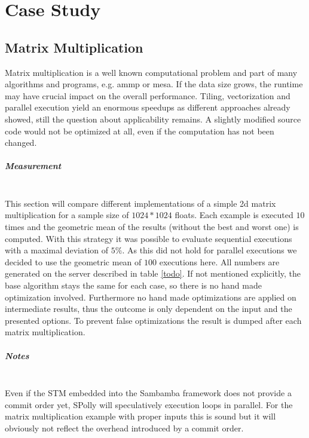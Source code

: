 
\chapter{Case Study} %
\label{Chapter6}


\section{Matrix Multiplication}
\label{MatrixMultiplication}
Matrix multiplication is a well known computational problem and part of many 
algorithms and programs, e.g. ammp or mesa.
If the data size grows, the runtime may have crucial impact on the
overall performance. Tiling, vectorization and parallel execution yield an
enormous speedups as different approaches already
showed\cite{grosser:thesis, JIMBOREAN-2012-664345},
still the question about applicability remains. A slightly modified source code 
would not be optimized at all, even if the computation has not been changed. 

\paragraph{Measurement} ~\\
This section will compare different implementations of a simple 2d
matrix multiplication for a sample size of  $1024*1024$ floats.
Each example is executed $10$ times and the geometric mean of the results 
(without the best and worst one) is computed. With this strategy it was possible 
to evaluate sequential executions with a maximal deviation of $5\%$. As this 
did not hold for parallel executions we decided to use the geometric mean of 
$100$ executions here. All numbers are generated on 
the server described in table \ref{todo}. If not mentioned explicitly, the base
algorithm stays the same for each case, so there is no hand made optimization 
involved. Furthermore no hand made optimizations are applied on intermediate 
results, thus the outcome is only dependent on the input and the presented 
options. To prevent false optimizations the result is dumped after each matrix
multiplication. 

\paragraph{Notes} ~\\
Even if the STM embedded into the Sambamba framework does
not provide a commit order yet, SPolly will speculatively execution loops in
parallel. For the matrix multiplication example with proper inputs 
this is sound but it will obviously not reflect the overhead introduced by a
commit order.


